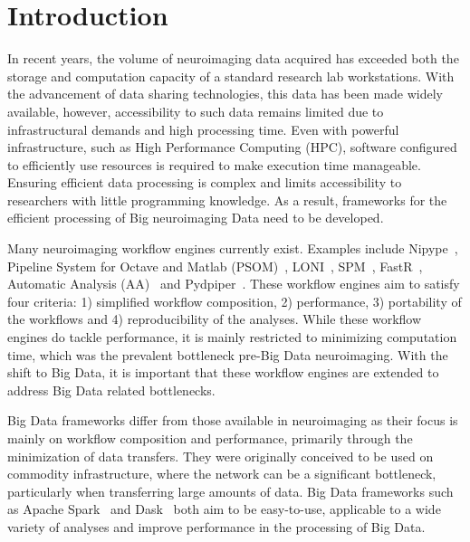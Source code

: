 \chapter{Introduction}

        In recent years, the volume of neuroimaging data acquired has exceeded
        both the storage and computation capacity of a standard research 
        lab workstations. With the advancement of data sharing technologies, 
        this data has been made widely available, however, accessibility to 
        such data remains limited due to infrastructural demands and high processing time.
        Even with powerful infrastructure, such as High
        Performance Computing (HPC), software configured to 
        efficiently use resources is required to make execution time manageable. 
        Ensuring efficient data processing is 
        complex and limits accessibility to researchers with little programming 
        knowledge. As a result, frameworks for the efficient 
        processing of Big neuroimaging Data need to be developed.
        
        Many neuroimaging workflow engines currently exist. Examples include
        Nipype~\cite{nipype}, Pipeline System for Octave and Matlab 
        (PSOM)~\cite{10.3389/fninf.2012.00007}, LONI~\cite{REX20031033}, 
        SPM~\cite{spm}, FastR~\cite{10.3389/fict.2016.00015},
        Automatic Analysis (AA)~\cite{10.3389/fninf.2014.00090} and 
        Pydpiper~\cite{10.3389/fninf.2014.00067}. These 
        workflow engines aim to satisfy four criteria: 1) simplified
        workflow composition, 2) performance, 3) portability of the workflows 
        and 4) reproducibility of the analyses. While these workflow engines
        do tackle performance, it is mainly restricted to minimizing computation
        time, which was the prevalent bottleneck pre-Big Data neuroimaging.
        With the shift to Big Data, it is important that these workflow engines are extended
        to address Big Data related bottlenecks.

        Big Data frameworks differ from those available in neuroimaging as their
        focus is mainly on workflow composition and performance, primarily
        through the minimization of data transfers. They were originally conceived
        to be used on commodity infrastructure, where the network can be a significant bottleneck,
        particularly when transferring large amounts of data. Big Data frameworks such as
        Apache Spark~\cite{Zaharia:2016:ASU:3013530.2934664} and
        Dask~\cite{rocklin2015dask} both aim to be easy-to-use, applicable to a
        wide variety of analyses and improve performance in the processing of
        Big Data.


